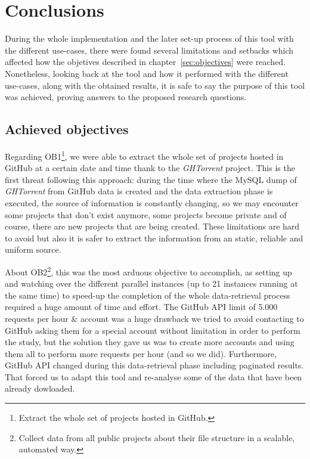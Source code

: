 \documentclass[a4paper, 12pt]{book}
\begin{document}
\chapter{Conclusions}
\label{sec:conclusions}
During the whole implementation and the later set-up process of this tool with the different use-cases,
there were found several limitations and setbacks which affected how the objetives described
in chapter~\ref{sec:objectives} were reached. Nonetheless, looking back at the tool and how
it performed with the different use-cases, along with the obtained results, it is safe to
say the purpose of this tool was achieved, proving answers to the proposed research questions.
\section{Achieved objectives}
\label{sec:achieved-objectives}
Regarding OB1\footnote{Extract the whole set of projects hosted in GitHub.},
we were able to extract the whole set of projects hosted in GitHub at
a certain date and time thank to the \emph{GHTorrent} project. This is the first threat
following this approach: during the time where the MySQL dump of \emph{GHTorrent} from GitHub data is created
and the data extraction phase is executed, the source of information is constantly changing,
so we may encounter some projects that don't exist anymore, some projects become private
and of course, there are new projects that are being created. These limitations are hard
to avoid but also it is safer to extract the information from an static, reliable and uniform source.\par
About OB2\footnote{Collect data from all public projects about their file structure in a scalable, automated way.},
this was the most arduous objective to accomplish, as setting up and watching over
the different parallel instances (up to 21 instances running at the same time) to speed-up the completion
of the whole data-retrieval process required a huge amount of time and effort. The GitHub API limit of
5.000 requests per hour \& account was a huge drawback we tried to avoid contacting to GitHub asking them for a special
account without limitation in order to perform the study, but the solution they gave us was to create more accounts
and using them all to perform more requests per hour (and so we did). Furthermore, GitHub API changed during this
data-retrieval phase including paginated results. That forced us to adapt this tool and re-analyse some of the data
that have been already dowloaded.\\
\end{document}
